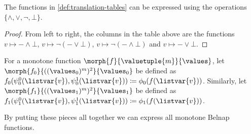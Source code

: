 \begin{lemma}
    \label{lem:translation-functions}
    The functions in \cref{def:translation-tables} can be expressed using the
    operations \(\{\land,\lor,\neg,\bot\}\).
\end{lemma}
\begin{proof}
    From left to right, the columns in the table above are the functions \(
    v \mapsto - \land \bot
    \), \(
    v \mapsto \neg(- \lor \bot)
    \), \(
    v \mapsto \neg(- \land \bot)
    \) and \(
    v \mapsto - \lor \bot
    \).
\end{proof}

\begin{definition}\label{def:falsy-truthy-functions}
    For a monotone function \(\morph{f}{\valuetuple{m}}{\values}\), let
    \(\morph{f_0}{((\values_0)^m)^2}{\values_0}\) be defined as
    \(
    f_0(\psi^0_0(\listvar{v}), \psi^1_0(\listvar{v}))
    \coloneqq
    \phi_0(f(\listvar{v}))
    \).
    Similarly, let \(\morph{f_1}{((\values_1)^m)^2}{\values_1}\) be defined as
    \(
    f_1(\psi^0_1(\listvar{v}), \psi^1_1(\listvar{v}))
    \coloneqq
    \phi_1(f(\listvar{v}))
    \).
\end{definition}

By putting these pieces all together we can express all monotone Belnap
functions.

